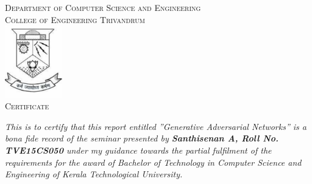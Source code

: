     \begin{center}
        \textsc{\Large{Department of Computer Science and Engineering}}\\[0.25cm]
        \textsc{\Large{College of Engineering Trivandrum}}\\[0.75cm]
        \includegraphics[width=2.5cm]{images/emblem.pdf}\\[1cm]
        
        \textsc{\LARGE{Certificate}}\\
        \justify
        \begin{doublespace}
            \textit{This is to certify that this report entitled 
            ''Generative Adversarial Networks'' is a bona fide record of the seminar 
            presented by \textbf{Santhisenan A, Roll No. TVE15CS050} under my 
            guidance towards the partial fulfilment of the requirements for the 
            award of Bachelor of Technology in Computer Science and Engineering of 
            Kerala Technological University.}\\[1cm]
        \end{doublespace}


\end{center}
